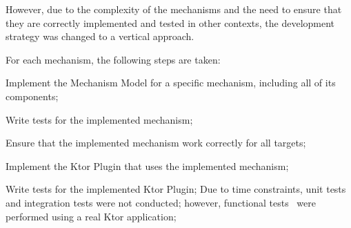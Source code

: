 However, due to the complexity of the mechanisms and the need to ensure that they are correctly implemented and tested
in other contexts, the development strategy was changed to a vertical approach.

For each mechanism, the following steps are taken:
\begin{boldenumerate}
    \item Implement the Mechanism Model for a specific mechanism, including all of its components;
    \item Write tests for the implemented mechanism;
    \item Ensure that the implemented mechanism work correctly for all targets;
    \item Implement the Ktor Plugin that uses the implemented mechanism;
    \item Write tests for the implemented Ktor Plugin;
    Due to time constraints, unit tests and integration tests were not conducted; however, functional tests~\cite{software-test-types} were performed using a real Ktor application;
\end{boldenumerate}
